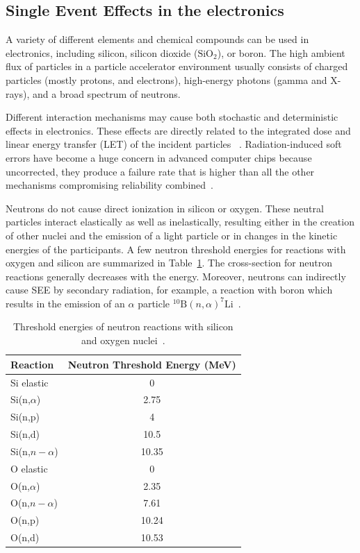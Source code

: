 \subsection{Single Event Effects in the electronics}

A variety of different elements and chemical compounds can be used in electronics, including silicon, silicon dioxide ($\mathrm{SiO}_{2}$), or boron. The high ambient flux of particles in a particle accelerator environment usually consists of charged particles (mostly protons, and electrons), high-energy photons (gamma and X-rays), and a broad spectrum of neutrons.

Different interaction mechanisms may cause both stochastic and deterministic effects in electronics. These effects are directly related to the integrated dose and linear energy transfer (\gls{LET}) of the incident particles ~\cite{electronic_system_on_module}. Radiation-induced soft errors have become a huge concern in advanced computer chips because uncorrected, they produce a failure rate that is higher than all the other mechanisms compromising reliability combined~\cite{1545891}. 

Neutrons do not cause direct ionization in silicon or oxygen. These neutral particles interact elastically as well as inelastically, resulting either in the creation of other nuclei and the emission of a light particle or in changes in the kinetic energies of the participants. A few neutron threshold energies for reactions with oxygen and silicon are summarized in Table~\ref{cross-seciton}. The cross-section for neutron reactions generally decreases with the energy. Moreover, neutrons can indirectly cause \gls{SEE} by secondary radiation, for example, a reaction with boron which results in the emission of an $\alpha$ particle $^{10}\mathrm{B}(n,\alpha)^{7}\mathrm{Li}$~\cite{1545891,neutrons_energy,neutrons_energy_2}. 

\begin{table}[!h]
\centering
\caption{Threshold energies of neutron reactions with silicon and oxygen nuclei~\cite{ENDF}.}
\begin{tabular}{lc}
\hline
Reaction         & Neutron Threshold Energy (MeV) \\ \hline
Si elastic       & 0                              \\
Si(n,$\alpha$)   & 2.75                           \\
Si(n,p)          & 4                              \\
Si(n,d)          & 10.5                           \\
Si(n,$n-\alpha$) & 10.35                          \\ \hline
O elastic        & 0                              \\
O(n,$\alpha$)    & 2.35                           \\
O(n,$n-\alpha$)  & 7.61                           \\
O(n,p)           & 10.24                          \\
O(n,d)           & 10.53                         
\end{tabular}

\label{cross-seciton}
\end{table}

